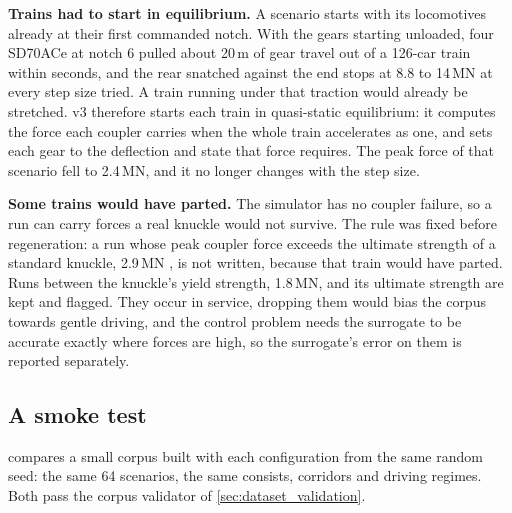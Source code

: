 \textbf{Trains had to start in equilibrium.} A scenario starts with its locomotives already at their first commanded notch. With the gears starting unloaded, four SD70ACe at notch 6 pulled about 20\,m of gear travel out of a 126-car train within seconds, and the rear snatched against the end stops at 8.8 to 14\,MN at every step size tried. A train running under that traction would already be stretched. v3 therefore starts each train in quasi-static equilibrium: it computes the force each coupler carries when the whole train accelerates as one, and sets each gear to the deflection and state that force requires. The peak force of that scenario fell to 2.4\,MN, and it no longer changes with the step size.

\textbf{Some trains would have parted.} The simulator has no coupler failure, so a run can carry forces a real knuckle would not survive. The rule was fixed before regeneration: a run whose peak coupler force exceeds the ultimate strength of a standard knuckle, 2.9\,MN \cite[p.~213]{Spiryagin2017HeavyHaul}, is not written, because that train would have parted. Runs between the knuckle's yield strength, 1.8\,MN, and its ultimate strength are kept and flagged. They occur in service, dropping them would bias the corpus towards gentle driving, and the control problem needs the surrogate to be accurate exactly where forces are high, so the surrogate's error on them is reported separately.

\subsection{A smoke test}
\label{sec:v3_smoke}

 compares a small corpus built with each configuration from the same random seed: the same 64 scenarios, the same consists, corridors and driving regimes. Both pass the corpus validator of \cref{sec:dataset_validation}.

